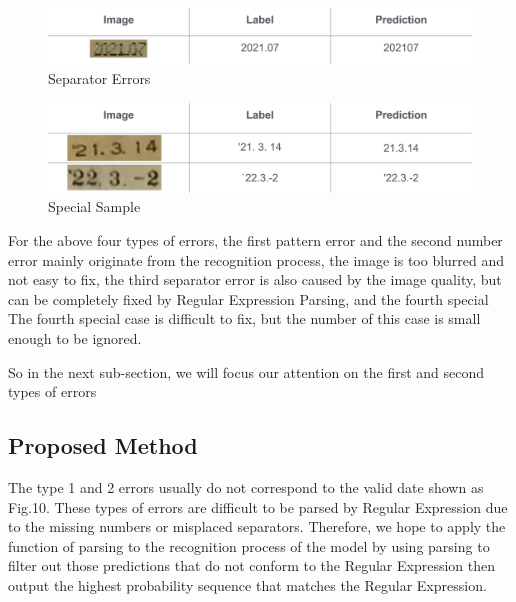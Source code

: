 \documentclass{article}
\begin{document}
\begin{figure}[ht] \centering    
	\label{separator errors}     
	\includegraphics[width=0.8\columnwidth]{separator.png}
	\caption{Separator Errors}
\end{figure}

\begin{figure}[ht] \centering    
	\label{special sample}     
	\includegraphics[width=0.8\columnwidth]{special sample.png}
	\caption{Special Sample}
\end{figure}

For the above four types of errors, the first pattern error and the second number error mainly originate from the recognition process, the image is too blurred and not easy to fix, the third separator error is also caused by the image quality, but can be completely fixed by Regular Expression Parsing, and the fourth special The fourth special case is difficult to fix, but the number of this case is small enough to be ignored.

So in the next sub-section, we will focus our attention on the first and second types of errors

\subsection{Proposed Method}

The type 1 and 2 errors usually do not correspond to the valid date shown as Fig.10. These types of errors are difficult to be parsed by Regular Expression due to the missing numbers or misplaced separators.
Therefore, we hope to apply the function of parsing to the recognition process of the model by using parsing to filter out those predictions that do not conform to the Regular Expression then output the highest probability sequence that matches the Regular Expression.\par
\end{document}
